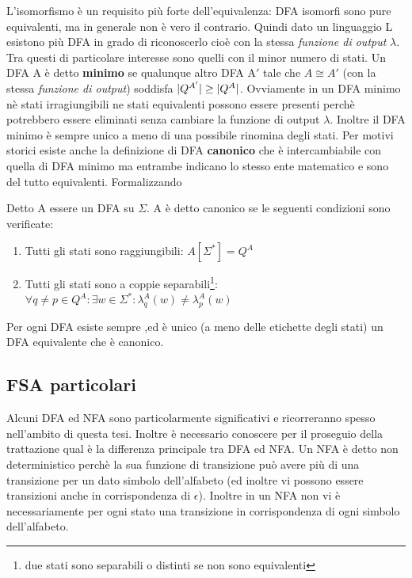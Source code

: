 L'isomorfismo è un requisito più forte dell'equivalenza: \ac{DFA} isomorfi sono pure equivalenti, ma in generale non è vero il contrario. Quindi dato un linguaggio L esistono più \ac{DFA} in grado di riconoscerlo cioè con la stessa \textit{funzione di output} $\lambda$. Tra questi di particolare interesse sono quelli con il minor numero di stati. Un \ac{DFA} A è detto \textbf{minimo} se qualunque altro \ac{DFA} $\text{A}'$ tale che $A \cong A'$ (con la stessa \textit{funzione di output}) soddisfa $\lvert Q^{A'}\rvert\geq\lvert Q^{A}\rvert$. Ovviamente in un \ac{DFA} minimo nè stati irragiungibili ne stati equivalenti possono essere presenti perchè potrebbero essere eliminati senza cambiare la funzione di output $\lambda$. Inoltre il DFA minimo è sempre unico a meno di una possibile rinomina degli stati. Per motivi storici esiste anche la definizione di \ac{DFA} \textbf{canonico} che è intercambiabile con quella di \ac{DFA} minimo ma entrambe indicano lo stesso ente matematico e sono del tutto equivalenti. Formalizzando
\begin{definizione*}
Detto A essere un \ac{DFA} su $\Sigma$. A è detto canonico se le seguenti condizioni sono verificate:
\begin{enumerate}
\item Tutti gli stati sono raggiungibili: $A[\Sigma^{*}] = Q^{A}$
\item Tutti gli stati sono a coppie separabili\footnote{due stati sono separabili o distinti se non sono equivalenti}: $\forall q \ne p \in Q^{A} : \exists w \in  \Sigma^{*} : \lambda_{q}^{A}(w) \ne \lambda_{p}^{A}(w)$
\end{enumerate}
\end{definizione*}
Per ogni DFA esiste sempre ,ed è unico (a meno delle etichette degli stati) un \ac{DFA} equivalente  che è canonico.
\subsection{FSA particolari}
Alcuni \ac{DFA} ed \ac{NFA} sono particolarmente significativi e ricorreranno spesso nell'ambito di questa tesi. Inoltre è necessario conoscere per il proseguio della trattazione qual è la differenza principale tra \ac{DFA} ed \ac{NFA}. Un \ac{NFA} è detto non deterministico perchè la sua funzione di transizione può avere più di una transizione per un dato simbolo dell'alfabeto (ed inoltre vi possono essere transizioni anche in corrispondenza di $\epsilon$). Inoltre in un \ac{NFA} non vi è necessariamente per ogni stato una transizione in corrispondenza di ogni simbolo dell'alfabeto.
